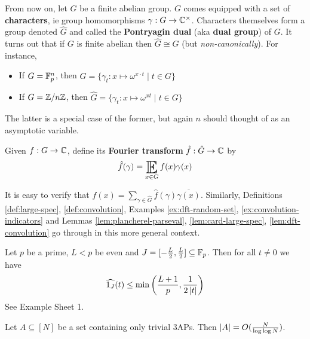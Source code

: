 \documentclass{article}
\begin{document}
From now on, let $G$ be a finite abelian group. $G$ comes equipped with a set of {\bf characters}, ie group homomorphisms $\gamma : G \to \mathbb C^\times$. Characters themselves form a group denoted $\hat G$ and called the {\bf Pontryagin dual} (aka {\bf dual group}) of $G$. It turns out that if $G$ is finite abelian then $\hat G \cong G$ (but {\it non-canonically}). For instance,
\begin{itemize}
  \item If $G = \mathbb F_p^n$, then $\hat G = \{\gamma_t : x \mapsto \omega^{x \cdot t} \mid t \in G\}$
  \item If $G = \mathbb Z/n\mathbb Z$, then $\hat G = \{\gamma_t : x \mapsto \omega^{xt} \mid t \in G\}$
\end{itemize}
The latter is a special case of the former, but again $n$ should thought of as an asymptotic variable.

\begin{dfn}
  Given $f : G \to \mathbb C$, define its {\bf Fourier transform} $\hat f : \hat G \to \mathbb C$ by
  $$\hat f(\gamma) = \E_{x \in G} f(x)\gamma(x)$$
\end{dfn}
It is easy to verify that $f(x) = \sum_{\gamma \in \hat G} \hat f(\gamma) \overline{\gamma(x)}$. Similarly, Definitions \ref{def:large-spec}, \ref{def:convolution}, Examples \ref{ex:dft-random-set}, \ref{ex:convolution-indicators} and Lemmas \ref{lem:plancherel-parseval}, \ref{lem:card-large-spec}, \ref{lem:dft-convolution} go through in this more general context.

\begin{eg}
  Let $p$ be a prime, $L < p$ be even and $J = [-\frac L2, \frac L2] \subseteq \mathbb F_p$. Then for all $t \ne 0$ we have
  $$\widehat{1_J}(t) \le \min\left(\frac{L + 1}p, \frac 1{2\left\lvert t\right\rvert}\right)$$
  See Example Sheet 1.
\end{eg}

\begin{thm}[Roth]
  Let $A \subseteq [N]$ be a set containing only trivial 3APs. Then $\left\lvert A\right\rvert = O(\frac N{\log\log N})$.
\end{thm}
\end{document}
